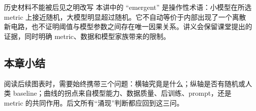 \begin{warningbox}{历史材料不能被后见之明改写}
本讲中的 ``emergent'' 是操作性术语：小模型在所选 metric 上接近随机，大模型明显超过随机。它不自动等价于内部出现了一个离散新电路，也不证明阈值与模型参数之间存在唯一因果关系。讲义会保留课堂提出的证据，同时明确 metric、数据和模型家族带来的限制。
\end{warningbox}

\subsection{本章小结}

阅读后续图表时，需要始终携带三个问题：横轴究竟是什么；纵轴是否有随机或人类 baseline；曲线的拐点来自模型能力、数据质量、后训练、prompt，还是 metric 的共同作用。后文所有“涌现”判断都应回到这三问。


